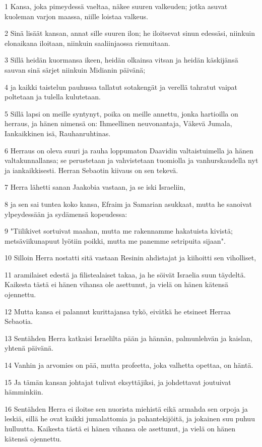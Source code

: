 \par 1 Kansa, joka pimeydessä vaeltaa, näkee suuren valkeuden; jotka asuvat kuoleman varjon maassa, niille loistaa valkeus.
\par 2 Sinä lisäät kansan, annat sille suuren ilon; he iloitsevat sinun edessäsi, niinkuin elonaikana iloitaan, niinkuin saaliinjaossa riemuitaan.
\par 3 Sillä heidän kuormansa ikeen, heidän olkainsa vitsan ja heidän käskijänsä sauvan sinä särjet niinkuin Midianin päivänä;
\par 4 ja kaikki taistelun pauhussa tallatut sotakengät ja verellä tahratut vaipat poltetaan ja tulella kulutetaan.
\par 5 Sillä lapsi on meille syntynyt, poika on meille annettu, jonka hartioilla on herraus, ja hänen nimensä on: Ihmeellinen neuvonantaja, Väkevä Jumala, Iankaikkinen isä, Rauhanruhtinas.
\par 6 Herraus on oleva suuri ja rauha loppumaton Daavidin valtaistuimella ja hänen valtakunnallansa; se perustetaan ja vahvistetaan tuomiolla ja vanhurskaudella nyt ja iankaikkisesti. Herran Sebaotin kiivaus on sen tekevä.
\par 7 Herra lähetti sanan Jaakobia vastaan, ja se iski Israeliin,
\par 8 ja sen sai tuntea koko kansa, Efraim ja Samarian asukkaat, mutta he sanoivat ylpeydessään ja sydämensä kopeudessa:
\par 9 "Tiilikivet sortuivat maahan, mutta me rakennamme hakatuista kivistä; metsäviikunapuut lyötiin poikki, mutta me panemme setripuita sijaan".
\par 10 Silloin Herra nostatti sitä vastaan Resinin ahdistajat ja kiihoitti sen viholliset,
\par 11 aramilaiset edestä ja filistealaiset takaa, ja he söivät Israelia suun täydeltä. Kaikesta tästä ei hänen vihansa ole asettunut, ja vielä on hänen kätensä ojennettu.
\par 12 Mutta kansa ei palannut kurittajansa tykö, eivätkä he etsineet Herraa Sebaotia.
\par 13 Sentähden Herra katkaisi Israelilta pään ja hännän, palmunlehvän ja kaislan, yhtenä päivänä.
\par 14 Vanhin ja arvomies on pää, mutta profeetta, joka valhetta opettaa, on häntä.
\par 15 Ja tämän kansan johtajat tulivat eksyttäjiksi, ja johdettavat joutuivat hämminkiin.
\par 16 Sentähden Herra ei iloitse sen nuorista miehistä eikä armahda sen orpoja ja leskiä, sillä he ovat kaikki jumalattomia ja pahantekijöitä, ja jokainen suu puhuu hulluutta. Kaikesta tästä ei hänen vihansa ole asettunut, ja vielä on hänen kätensä ojennettu.
